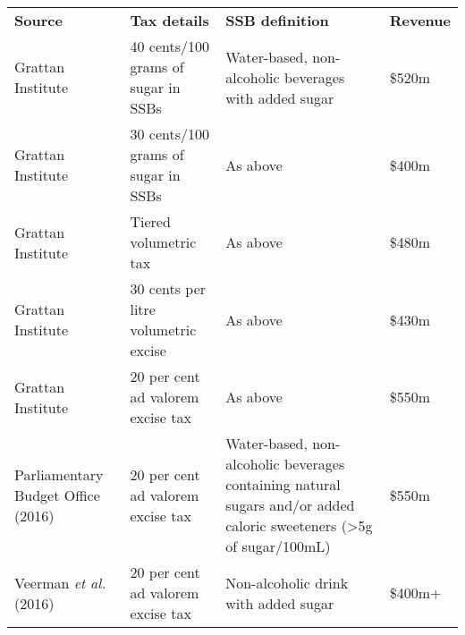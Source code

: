 \bgroup
\def\arraystretch{1.5}
\begin{tabularx}{\columnwidth}{p{2.5cm}p{2.4cm}p{3.3cm}*1{>{\centering\arraybackslash}X}}
\toprule
\textbf{Source  } & \textbf{Tax details} & \textbf{SSB definition} & \textbf{Revenue} \\ \cmidrule(lr){1-4}
Grattan Institute & 40 cents/100 grams of sugar in SSBs & Water-based, non-alcoholic beverages with added sugar & \$520m \\
Grattan Institute & 30 cents/100 grams of sugar in SSBs & As above & \$400m \\
Grattan Institute & Tiered volumetric tax & As above & \$480m \\
Grattan Institute & 30 cents per litre volumetric excise & As above & \$430m \\
Grattan Institute & 20 per cent ad valorem excise tax & As above & \$550m \\
Parliamentary Budget Office (2016) & 20 per cent ad valorem excise tax & Water-based, non-alcoholic beverages containing natural sugars and/or added caloric sweeteners (\textgreater{}5g of sugar/100mL) & \$550m \\
Veerman \emph{et al.} (2016) & 20 per cent ad valorem excise tax & Non-alcoholic drink with added sugar & \$400m+ \\
\bottomrule
\end{tabularx}
\egroup